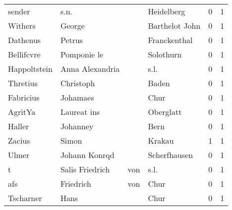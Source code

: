 \begin{tabular}{llllrr}
                   sender &                               s.n. &             &                                  Heidelberg &          0 &         1 \\
                  Withers &                             George &             &                              Barthelot John &          0 &         1 \\
                 Dathenus &                             Petrus &             &                                Franckenthal &          0 &         1 \\
               Bellifcvre &                        Pomponie le &             &                                   Solothurn &          0 &         1 \\
             Happoltstein &                    Anna Alexandria &             &                                        s.l. &          0 &         1 \\
                 Thretius &                          Christoph &             &                                       Baden &          0 &         1 \\
                Fabricius &                           Johamaes &             &                                        Chur &          0 &         1 \\
                  AgritYa &                        Laureat ins &             &                                   Oberglatt &          0 &         1 \\
                   Haller &                           Johanney &             &                                        Bern &          0 &         1 \\
                   Zacius &                              Simon &             &                                      Krakau &          1 &         1 \\
                    Ulmer &                      Johann Konrqd &             &                                Scherfhausen &          0 &         1 \\
                        t &                    Salis Friedrich &         von &                                        s.l. &          0 &         1 \\
                      afs &                          Friedrich &         von &                                        Chur &          0 &         1 \\
                Tscharner &                               Hans &             &                                        Chur &          0 &         1 \\

\end{tabular}
